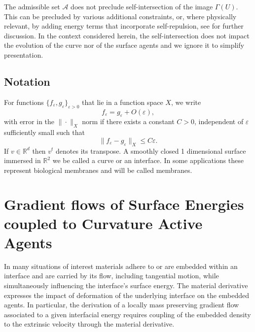 \documentclass[11pt]{amsart}
\theoremstyle{plain}
\def\cA{{\mathcal A}}
\def\mbbR{\mathbb{R}}
\def\eps{\varepsilon}
\numberwithin{equation}{section}
\theoremstyle{plain}
\begin{document}
The admissible set $\cA$ does not preclude self-intersection of the image $\Gamma(U).$ This can be precluded by various additional constraints,
or,  where physically relevant, by  adding energy terms that incorporate self-repulsion, see  \cite{NPW_25} for further discussion.
In the context considered herein, the self-intersection does not impact the evolution of the curve nor of the surface agents and we ignore it to simplify presentation.

\subsection{Notation}
For functions $\{f_\eps, g_\eps\}_{\eps>0}$ that lie in a function space $X$, we write
$$ f_\eps=g_\eps+O(\eps),$$
with error in the $\|\cdot\|_X$ norm if there exists a constant $C>0$, independent of $\eps$ sufficiently small such that
$$ \|f_\eps-g_\eps\|_{X}\le C\eps.$$
If $v\in\mbbR^d$ then $v^t$ denotes its transpose.
A smoothly closed 1 dimensional surface immersed in $\mbbR^2$ we be called a curve or an interface. In some applications these represent biological membranes and will be called membranes.

\section{Gradient flows of Surface Energies coupled to Curvature Active Agents}
In many situations of interest materials adhere to  or are embedded within an interface and are carried by its flow, including tangential motion, while simultaneously influencing the interface's surface energy.  The material derivative expresses the impact of deformation of the underlying interface on the embedded agents. In particular, the derivation of a locally mass preserving gradient flow associated to a given interfacial energy requires coupling of the embedded density to the extrinsic velocity through the material derivative. 
\end{document}
